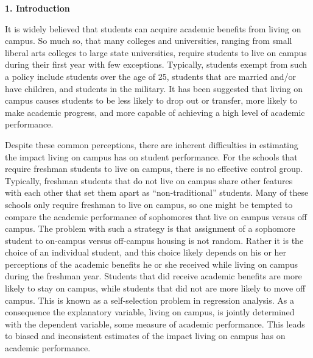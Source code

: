\documentclass[12pt]{article}
\begin{document}

\begin{center}\textbf{1. Introduction}\end{center}

It is widely believed that students can acquire academic benefits from living on campus.  So much so, that many colleges and universities, ranging from small liberal arts colleges to large state universities, require students to live on campus during their first year with few exceptions.  Typically, students exempt from such a policy include students over the age of 25, students that are married and/or have children, and students in the military.  It has been suggested that living on campus causes students to be less likely to drop out or transfer, more likely to make academic progress, and more capable of achieving a high level of academic performance.

Despite these common perceptions, there are inherent difficulties in estimating the impact living on campus has on student performance.  For the schools that require freshman students to live on campus, there is no effective control group.  Typically, freshman students that do not live on campus share other features with each other that set them apart as ``non-traditional'' students.  Many of these schools only require freshman to live on campus, so one might be tempted to compare the academic performance of sophomores that live on campus versus off campus.  The problem with such a strategy is that assignment of a sophomore student to on-campus versus off-campus housing is not random.  Rather it is the choice of an individual student, and this choice likely depends on his or her perceptions of the academic benefits he or she received while living on campus during the freshman year.  Students that did receive academic benefits are more likely to stay on campus, while students that did not are more likely to move off campus.  This is known as a self-selection problem in regression analysis.  As a consequence the explanatory variable, living on campus, is jointly determined with the dependent variable, some measure of academic performance.  This leads to biased and inconsistent estimates of the impact living on campus has on academic performance.
\end{document}
